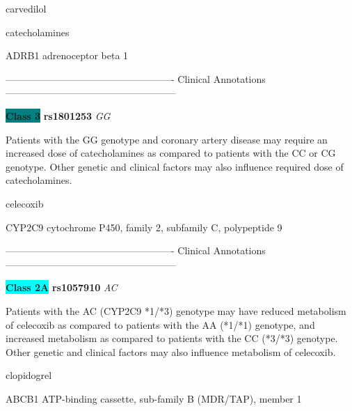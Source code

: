 \documentclass{resume} %
\begin{document}
\begin{rSection}{ carvedilol }
\end{rSection}\begin{rSection}{ catecholamines }
\item[]

\begin{rSubsection}{ ADRB1 }{ adrenoceptor beta 1 }{}{}
\item[]

\item[] ---------------------------------------------------- Clinical Annotations -----------------------------------------------------\newline
\item \textbf{\colorbox{teal} {Class 3}} \textbf{ rs1801253 } \textit{ GG }
\item[] Patients with the GG genotype and coronary artery disease may require an increased dose of catecholamines as compared to patients with the CC or CG genotype. Other genetic and clinical factors may also influence required dose of catecholamines.
\end{rSubsection}

\end{rSection}\begin{rSection}{ celecoxib }
\item[]

\begin{rSubsection}{ CYP2C9 }{ cytochrome P450, family 2, subfamily C, polypeptide 9 }{}{}
\item[]

\item[] ---------------------------------------------------- Clinical Annotations -----------------------------------------------------\newline
\item \textbf{\colorbox{cyan} {Class 2A}} \textbf{ rs1057910 } \textit{ AC }
\item[] Patients with the AC (CYP2C9 *1/*3) genotype may have reduced metabolism of celecoxib as compared to patients with the AA (*1/*1) genotype, and increased metabolism as compared to patients with the CC (*3/*3) genotype. Other genetic and clinical factors may also influence metabolism of celecoxib. 
\end{rSubsection}

\end{rSection}\begin{rSection}{ clopidogrel }
\item[]

\begin{rSubsection}{ ABCB1 }{ ATP-binding cassette, sub-family B (MDR/TAP), member 1 }{}{}
\item[]


\end{rSubsection}
\end{rSection}
\end{document}
